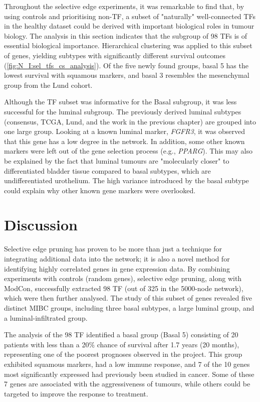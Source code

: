 Throughout the selective edge experiments, it was remarkable to find that, by using controls and prioritising non-TF, a subset of "naturally" well-connected TFs in the healthy dataset could be derived with important biological roles in tumour biology. The analysis in this section indicates that the subgroup of 98 TFs is of essential biological importance. Hierarchical clustering was applied to this subset of genes, yielding subtypes with significantly different survival outcomes (\cref{fig:N_I:sel_tfs_cs_analysis}). Of the five newly found groups, basal 5 has the lowest survival with squamous markers, and basal 3 resembles the mesenchymal group from the Lund cohort.

Although the TF subset was informative for the Basal subgroup, it was less successful for the luminal subgroup. The previously derived luminal subtypes (consensus, TCGA, Lund, and the work in the previous chapter) are grouped into one large group. Looking at a known luminal marker, \textit{FGFR3}, it was observed that this gene has a low degree in the network. In addition, some other known markers were left out of the gene selection process (e.g., \textit{PPARG}). This may also be explained by the fact that luminal tumours are "molecularly closer" to differentiated bladder tissue compared to basal subtypes, which are undifferentiated urothelium. The high variance introduced by the basal subtype could explain why other known gene markers were overlooked.

\section{Discussion}

Selective edge pruning has proven to be more than just a technique for integrating additional data into the network; it is also a novel method for identifying highly correlated genes in gene expression data. By combining experiments with controls (random genes), selective edge pruning, along with ModCon, successfully extracted 98 TF (out of 325 in the 5000-node network), which were then further analysed. The study of this subset of genes revealed five distinct MIBC groups, including three basal subtypes, a large luminal group, and a luminal-infiltrated group.

The analysis of the 98 TF identified a basal group (Basal 5) consisting of 20 patients with less than a 20\% chance of survival after 1.7 years (20 months), representing one of the poorest prognoses observed in the project. This group exhibited squamous markers, had a low immune response, and 7 of the 10 genes most significantly expressed had previously been studied in cancer. Some of these 7 genes are associated with the aggressiveness of tumours, while others could be targeted to improve the response to treatment.

